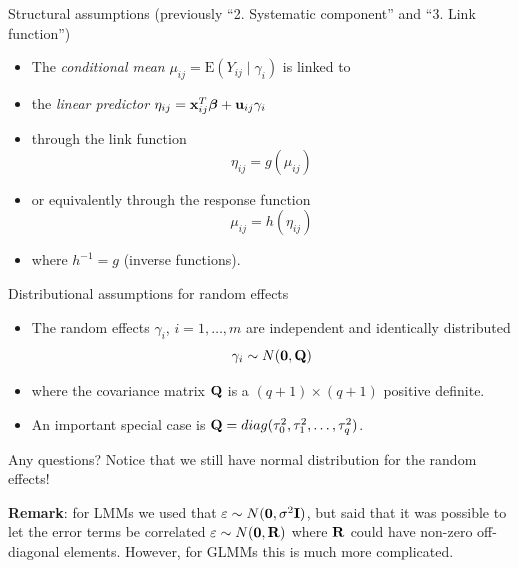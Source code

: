 \documentclass[
  ignorenonframetext,
]{beamer}
\providecommand{\tightlist}{%
  \setlength{\itemsep}{0pt}\setlength{\parskip}{0pt}}
\begin{document}
\begin{frame}
\begin{block}{Structural assumptions}
\protect{}\label{structural-assumptions}
(previously ``2. Systematic component'' and ``3. Link function'')

\begin{itemize}
\tightlist
\item
  The \emph{conditional mean} \(\mu_{ij}=\text{E}(Y_{ij}\mid \gamma_i)\)
  is linked to
\item
  the \emph{linear predictor}
  \(\eta_{ij}={\bf x}_{ij}^T {\boldsymbol \beta}+ {\bf u}_{ij} \gamma_i\)
\item
  through the link function \[\eta_{ij}=g(\mu_{ij})\]
\item
  or equivalently through the response function
  \[\mu_{ij}=h(\eta_{ij})\]
\item
  where \(h^{-1}=g\) (inverse functions).
\end{itemize}
\end{block}
\end{frame}

\begin{frame}
\begin{block}{Distributional assumptions for random effects}
\protect{}\label{distributional-assumptions-for-random-effects}
\begin{itemize}
\tightlist
\item
  The random effects \(\gamma_i\), \(i=1,\ldots,m\) are independent and
  identically distributed \[ \gamma_i \sim N({\bf 0}, {\bf Q})\]
\item
  where the covariance matrix \({\bf Q}\) is a \((q+1)\times (q+1)\)
  positive definite.
\item
  An important special case is
  \({\bf Q}=diag(\tau_0^2, \tau_1^2,\ldots,\tau_q^2)\).
\end{itemize}

{Any questions? Notice that we still have normal distribution for the
random effects!}

\textbf{Remark}: for LMMs we used that
\(\varepsilon \sim N({\bf 0}, \sigma^2 {\bf I})\), but said that it was
possible to let the error terms be correlated
\(\varepsilon \sim N({\bf 0}, {\bf R})\) where \({\bf R}\) could have
non-zero off-diagonal elements. However, for GLMMs this is much more
complicated.
\end{block}
\end{frame}
\end{document}
